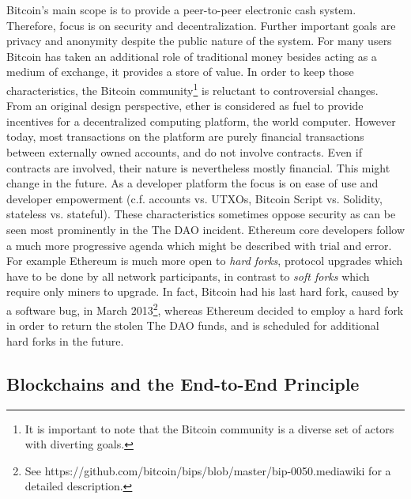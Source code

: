 Bitcoin's main scope is to provide a peer-to-peer electronic cash system. Therefore, focus is on security and decentralization. Further important goals are privacy and anonymity despite the public nature of the system. For many users Bitcoin has taken an additional role of traditional money besides acting as a medium of exchange, it provides a store of value. In order to keep those characteristics, the Bitcoin community\footnote{It is important to note that the Bitcoin community is a diverse set of actors with diverting goals.} is reluctant to controversial changes. From an original design perspective, ether is considered as fuel to provide incentives for a decentralized computing platform, the world computer. However today, most transactions on the platform are purely financial transactions between externally owned accounts, and do not involve contracts. Even if contracts are involved, their nature is nevertheless mostly financial. This might change in the future. As a developer platform the focus is on ease of use and developer empowerment (c.f. accounts vs. UTXOs, Bitcoin Script vs. Solidity, stateless vs. stateful). These characteristics sometimes oppose security as can be seen most prominently in the {The DAO} incident. Ethereum core developers follow a much more progressive agenda which might be described with trial and error. For example Ethereum is much more open to \emph{hard forks}, protocol upgrades which have to be done by all network participants, in contrast to \emph{soft forks} which require only miners to upgrade. In fact, Bitcoin had his last hard fork, caused by a software bug, in March 2013\footnote{See https://github.com/bitcoin/bips/blob/master/bip-0050.mediawiki for a detailed description.}, whereas Ethereum decided to employ a hard fork in order to return the stolen The DAO funds, and is scheduled for additional hard forks in the future. 

\subsection{Blockchains and the End-to-End Principle}

